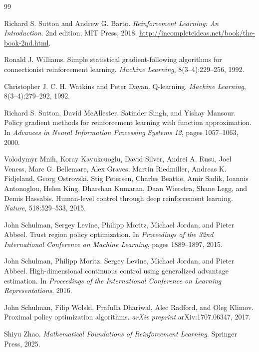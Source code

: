 \documentclass[11pt]{article}
\newcommand{\1}{\mathbf{1}}
\begin{document}
\begin{thebibliography}{99}

Richard S. Sutton and Andrew G. Barto.
\newblock \emph{Reinforcement Learning: An Introduction}.
\newblock 2nd edition, MIT Press, 2018.
\newblock \url{http://incompleteideas.net/book/the-book-2nd.html}.

Ronald J. Williams.
\newblock Simple statistical gradient-following algorithms for connectionist reinforcement learning.
\newblock \emph{Machine Learning}, 8(3--4):229--256, 1992.

Christopher J. C. H. Watkins and Peter Dayan.
\newblock Q-learning.
\newblock \emph{Machine Learning}, 8(3--4):279--292, 1992.

Richard S. Sutton, David McAllester, Satinder Singh, and Yishay Mansour.
\newblock Policy gradient methods for reinforcement learning with function approximation.
\newblock In \emph{Advances in Neural Information Processing Systems 12}, pages 1057--1063, 2000.

Volodymyr Mnih, Koray Kavukcuoglu, David Silver, Andrei A. Rusu, Joel Veness, Marc G. Bellemare, Alex Graves, Martin Riedmiller, Andreas K. Fidjeland, Georg Ostrovski, Stig Petersen, Charles Beattie, Amir Sadik, Ioannis Antonoglou, Helen King, Dharshan Kumaran, Daan Wierstra, Shane Legg, and Demis Hassabis.
\newblock Human-level control through deep reinforcement learning.
\newblock \emph{Nature}, 518:529--533, 2015.

John Schulman, Sergey Levine, Philipp Moritz, Michael Jordan, and Pieter Abbeel.
\newblock Trust region policy optimization.
\newblock In \emph{Proceedings of the 32nd International Conference on Machine Learning}, pages 1889--1897, 2015.

John Schulman, Philipp Moritz, Sergey Levine, Michael Jordan, and Pieter Abbeel.
\newblock High-dimensional continuous control using generalized advantage estimation.
\newblock In \emph{Proceedings of the International Conference on Learning Representations}, 2016.

John Schulman, Filip Wolski, Prafulla Dhariwal, Alec Radford, and Oleg Klimov.
\newblock Proximal policy optimization algorithms.
\newblock \emph{arXiv preprint} arXiv:1707.06347, 2017.

Shiyu Zhao.
\newblock \emph{Mathematical Foundations of Reinforcement Learning}.
\newblock Springer Press, 2025.

\end{thebibliography}
\end{document}

